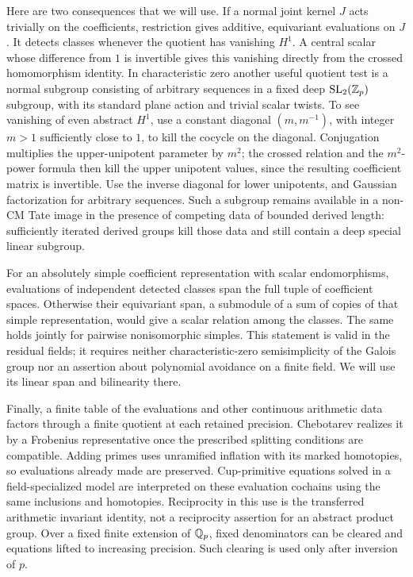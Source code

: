 Here are two consequences that we will use.  If a normal joint kernel
$J$ acts trivially on the coefficients, restriction gives additive,
equivariant evaluations on $J$.  It detects classes whenever the
quotient has vanishing $H^1$.  A central scalar whose difference from
$1$ is invertible gives this vanishing directly from the crossed
homomorphism identity.  In characteristic zero another useful
quotient test is a normal subgroup consisting of arbitrary sequences
in a fixed deep $\operatorname{SL}_2(\mathbb Z_p)$ subgroup, with its standard
plane action and trivial scalar twists.  To see vanishing of even
abstract $H^1$, use a constant diagonal $(m,m^{-1})$, with integer
$m>1$ sufficiently close to $1$, to kill the cocycle on the diagonal.
Conjugation multiplies the upper-unipotent parameter by $m^2$; the
crossed relation and the $m^2$-power formula then kill the upper
unipotent values, since the resulting coefficient matrix is
invertible.  Use the inverse diagonal for lower unipotents, and
Gaussian factorization for arbitrary sequences.  Such a subgroup
remains available in a non-CM Tate image in the presence of competing
data of bounded derived length: sufficiently iterated derived groups
kill those data and still contain a deep special linear subgroup.

For an absolutely simple coefficient representation with scalar
endomorphisms, evaluations of independent detected classes span the
full tuple of coefficient spaces.  Otherwise their equivariant span,
a submodule of a sum of copies of that simple representation, would
give a scalar relation among the classes.  The same holds jointly for
pairwise nonisomorphic simples.  This statement is valid in the
residual fields; it requires neither characteristic-zero
semisimplicity of the Galois group nor an assertion about polynomial
avoidance on a finite field.  We will use its linear span and
bilinearity there.

Finally, a finite table of the evaluations and other continuous
arithmetic data factors through a finite quotient at each retained
precision.  Chebotarev realizes it by a Frobenius representative once
the prescribed splitting conditions are compatible.  Adding primes
uses unramified inflation with its marked homotopies, so evaluations
already made are preserved.  Cup-primitive equations solved in a
field-specialized model are interpreted on these evaluation cochains
using the same inclusions and homotopies.  Reciprocity in this use is
the transferred arithmetic invariant identity, not a reciprocity
assertion for an abstract product group.  Over a fixed finite extension
of $\mathbb Q_p$, fixed denominators can be cleared and equations lifted to
increasing precision.  Such clearing is used only after inversion of
$p$.

